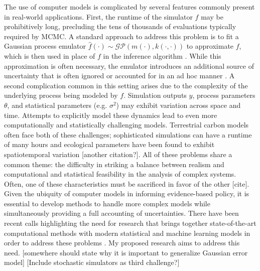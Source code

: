 \documentclass[12pt]{article}
\begin{document}
The use of computer models is complicated by several features commonly present in real-world applications. First, the runtime of the simulator $f$ may be prohibitively long, precluding the tens of thousands of evaluations typically required by MCMC. A standard approach to address this problem is to fit a Gaussian process 
emulator $\hat{f}(\cdot) \sim \mathcal{GP}(m(\cdot), k(\cdot, \cdot))$ to approximate $f$, which is then used in place of $f$ in the inference algorithm \cite{Kennedy, Fer, Cleary}. While this approximation is often necessary, the emulator introduces an additional source of uncertainty that is often ignored 
or accounted for in an ad hoc manner \cite{Fer}. A second complication common in this setting arises due to the complexity of the underlying process being modeled by $f$. Simulation outputs $y$, process parameters $\theta$, and statistical parameters 
(e.g. $\sigma^2$) may exhibit variation across space and time. Attempts to explicitly model these dynamics lead to even more computationally and statistically challenging models. Terrestrial carbon models often face both of these challenges; sophisticated simulations can have a runtime of many hours \cite{Fer} and ecological parameters have been found to exhibit spatiotemporal variation \cite{Fer2} [another citation?]. All of these problems share a common theme: the difficulty in striking a balance between realism and computational and statistical feasibility in the analysis of complex systems. Often, one of these characteristics must be sacrificed in favor of the other [cite].
Given the ubiquity of computer models in informing evidence-based policy, it is essential to develop methods to handle more complex models while simultaneously providing a full accounting of uncertainties. 
There have been recent calls highlighting the need for research that brings together state-of-the-art computational methods with modern statistical and machine learning models in order to address these problems \cite{Wikle, Baker}. My proposed research aims to address this need. 
[somewhere should state why it is important to generalize Gaussian error model] [Include stochastic simulators as third challenge?]
\end{document}
